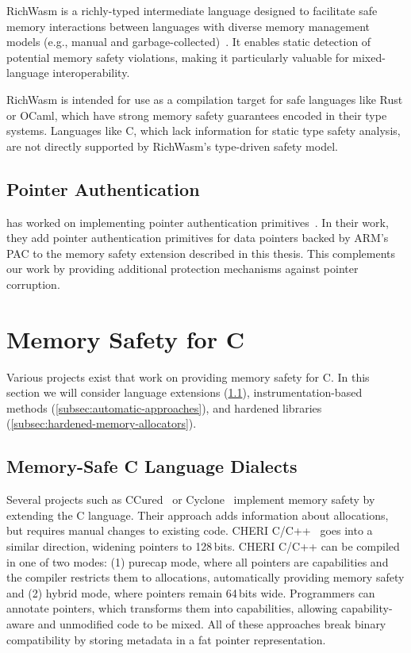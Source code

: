 RichWasm is a richly-typed intermediate language designed to facilitate safe memory interactions between languages with diverse memory management models (e.g., manual and garbage-collected)~\cite{paraskevopoulou2024richwasm}.
It enables static detection of potential memory safety violations, making it particularly valuable for mixed-language interoperability.

RichWasm is intended for use as a compilation target for safe languages like Rust or OCaml, which have strong memory safety guarantees encoded in their type systems.
Languages like C, which lack information for static type safety analysis, are not directly supported by RichWasm's type-driven safety model.

\subsection{Pointer Authentication}
\label{subsec:related-pointer-authentication}

\citeauthor*{rehde2023wasm} has worked on implementing pointer authentication primitives~\cite{rehde2023wasm}.
In their work, they add pointer authentication primitives for data pointers backed by ARM's \ac{PAC} to the memory safety extension described in this thesis.
This complements our work by providing additional protection mechanisms against pointer corruption.

\section{Memory Safety for C}
\label{sec:related-memory-safety}

Various projects exist that work on providing memory safety for C.
In this section we will consider language extensions (\cref{subsec:extensions-to-the-c-language}), instrumentation-based methods (\cref{subsec:automatic-approaches}), and hardened libraries (\cref{subsec:hardened-memory-allocators}).

\subsection{Memory-Safe C Language Dialects}
\label{subsec:extensions-to-the-c-language}

Several projects such as CCured~\cite{necula2002ccured} or Cyclone~\cite{jim2002cyclone} implement memory safety by extending the C language.
Their approach adds information about allocations, but requires manual changes to existing code.
CHERI C/C++~\cite{watson_cheri_2020} goes into a similar direction, widening pointers to 128\,bits.
CHERI C/C++ can be compiled in one of two modes: (1) purecap mode, where all pointers are capabilities and the compiler restricts them to allocations, automatically providing memory safety and (2) hybrid mode, where pointers remain 64\,bits wide.
Programmers can annotate pointers, which transforms them into capabilities, allowing capability-aware and unmodified code to be mixed.
All of these approaches break binary compatibility by storing metadata in a fat pointer representation.

